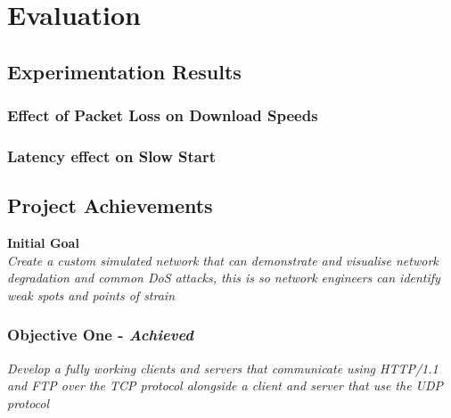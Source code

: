 \chapter{Evaluation}


\section{Experimentation Results}

	\subsection{Effect of Packet Loss on Download Speeds}
	

	\subsection{Latency effect on Slow Start}
	

\clearpage
\section{Project Achievements}

{\bf Initial Goal}\\
{\it Create a custom simulated network that can demonstrate and visualise network degradation and common DoS attacks, this is so network engineers can identify weak spots and points of strain}

\newcommand{\chromeUrl}{\url{https://www.google.com/chrome/index.html}}
\newcommand{\firefoxUrl}{\url{https://www.mozilla.org/en-US/firefox/new/}}
\newcommand{\fileZillaUrl}{\url{https://filezilla-project.org/}}

\subsection{Objective One - {\it Achieved}}
{\it Develop a fully working clients and servers that communicate using HTTP/1.1 and FTP over the TCP protocol alongside a client and server that use the UDP protocol}

